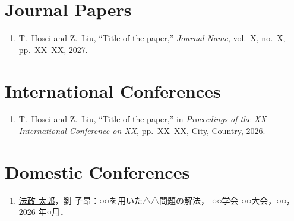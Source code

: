 \begin{publications}

\section*{Journal Papers}
\begin{enumerate}
  \item \underline{T.~Hosei} and Z.~Liu,
    ``Title of the paper,''
    \textit{Journal Name}, vol.~X, no.~X, pp.~XX--XX, 2027.
\end{enumerate}

\section*{International Conferences}
\begin{enumerate}
  \item \underline{T.~Hosei} and Z.~Liu,
    ``Title of the paper,''
    in \textit{Proceedings of the XX International Conference on XX}, pp.~XX--XX, City, Country, 2026.
\end{enumerate}

\section*{Domestic Conferences}
\begin{enumerate}
  \item \underline{法政 太郎}，劉 子昂：○○を用いた△△問題の解法，
    ○○学会 ○○大会，○○，2026 年○月．
\end{enumerate}

\end{publications}

